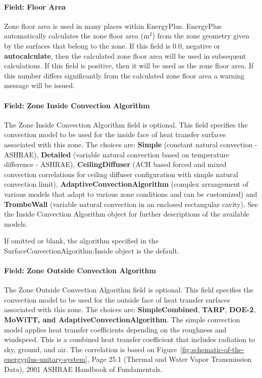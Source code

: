 \paragraph{Field: Floor Area}\label{field-floor-area}

Zone floor area is used in many places within EnergyPlus. EnergyPlus automatically calculates the zone floor area (m\(^{2}\)) from the zone geometry given by the surfaces that belong to the zone. If this field is 0.0, negative or \textbf{autocalculate}, then the calculated zone floor area will be used in subsequent calculations. If this field is positive, then it will be used as the zone floor area. If this number differs significantly from the calculated zone floor area a warning message will be issued.

\paragraph{Field: Zone Inside Convection Algorithm}\label{field-zone-inside-convection-algorithm}

The Zone Inside Convection Algorithm field is optional. This field specifies the convection model to be used for the inside face of heat transfer surfaces associated with this zone. The choices are: \textbf{Simple} (constant natural convection - ASHRAE), \textbf{Detailed} (variable natural convection based on temperature difference - ASHRAE), \textbf{CeilingDiffuser} (ACH based forced and mixed convection correlations for ceiling diffuser configuration with simple natural convection limit), \textbf{AdaptiveConvectionAlgorithm} (complex arrangement of various models that adapt to various zone conditions and can be customized) and \textbf{TrombeWall} (variable natural convection in an enclosed rectangular cavity). See the Inside Convection Algorithm object for further descriptions of the available models.

If omitted or blank, the algorithm specified in the SurfaceConvectionAlgorithm:Inside object is the default.

\paragraph{Field: Zone Outside Convection Algorithm}\label{field-zone-outside-convection-algorithm}

The Zone Outside Convection Algorithm field is optional. This field specifies the convection model to be used for the outside face of heat transfer surfaces associated with this zone. The choices are: \textbf{SimpleCombined}, \textbf{TARP}, \textbf{DOE-2}, \textbf{MoWiTT, and AdaptiveConvectionAlgorithm}. The simple convection model applies heat transfer coefficients depending on the roughness and windspeed. This is a combined heat transfer coefficient that includes radiation to sky, ground, and air. The correlation is based on Figure~\ref{fig:schematic-of-the-energyplus-unitary-system}, Page 25.1 (Thermal and Water Vapor Transmission Data), 2001 ASHRAE Handbook of Fundamentals.

